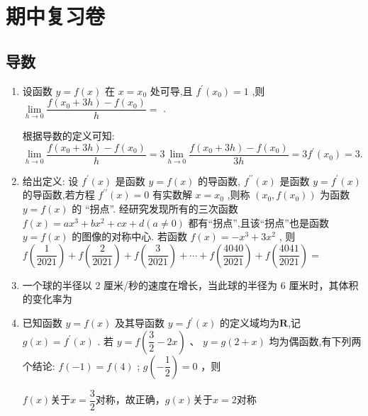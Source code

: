 \section*{期中复习卷}
\subsection*{导数}
\begin{enumerate}
    \item 设函数 $y = f\left( x\right)$ 在 $x = {x}_{0}$ 处可导,且 ${f}^{\prime }\left( {x}_{0}\right)  = 1$ ,则 $\mathop{\lim }\limits_{{h \rightarrow  0}}\dfrac{f\left( {{x}_{0} + {3h}}\right)  - f\left( {x}_{0}\right) }{h} =$ .
    \begin{jieda}
        根据导数的定义可知: $\mathop{\lim }\limits_{{h \rightarrow  0}}\dfrac{f\left( {{x}_{0} + {3h}}\right)  - f\left( {x}_{0}\right) }{h} = 3\mathop{\lim }\limits_{{h \rightarrow  0}}\dfrac{f\left( {{x}_{0} + {3h}}\right)  - f\left( {x}_{0}\right) }{3h} = 3{f}^{\prime }\left( {x}_{0}\right)  = 3$.
    \end{jieda}
    
    \item 给出定义: 设 ${f}^{\prime }\left( x\right)$ 是函数 $y = f\left( x\right)$ 的导函数, ${f}^{\prime \prime }\left( x\right)$ 是函数 $y = {f}^{\prime }\left( x\right)$ 的导函数,若方程 ${f}^{\prime \prime }\left( x\right)  = 0$ 有实数解 $x = {x}_{0}$ ,则称 $\left( {{x}_{0},f\left( {x}_{0}\right) }\right)$ 为函数 $y = f\left( x\right)$ 的 “拐点”. 经研究发现所有的三次函数 $f\left( x\right)  = a{x}^{3} + b{x}^{2} + {cx} + d\left( {a \neq  0}\right)$ 都有“拐点”,且该“拐点”也是函数 $y = f\left( x\right)$ 的图像的对称中心. 若函数 $f\left( x\right)  =  - {x}^{3} + 3{x}^{2}$ , 则 $f\left( \dfrac{1}{2021}\right)  + f\left( \dfrac{2}{2021}\right)  + f\left( \dfrac{3}{2021}\right)  + \cdots  + f\left( \dfrac{4040}{2021}\right)  + f\left( \dfrac{4041}{2021}\right)  =$
    
    \item 一个球的半径以 2 厘米/秒的速度在增长，当此球的半径为 6 厘米时，其体积的变化率为
    
    \item 已知函数 $y = f\left( x\right)$ 及其导函数 $y = {f}^{\prime }\left( x\right)$ 的定义域均为$\mathbf{R}$,记 $g\left( x\right)  = {f}^{\prime }\left( x\right)$ . 若 $y = f\left( {\dfrac{3}{2} - {2x}}\right) \text{ 、 }y = g\left( {2 + x}\right)$ 均为偶函数,有下列两个结论:    $f\left( {-1}\right)  = f\left( 4\right)$ ;    $g\left( {-\dfrac{1}{2}}\right)  = 0$ ，则
    \begin{jieda}
        $f(x)$关于$x = \dfrac{3}{2}$对称，故正确，$g(x)$关于$x = 2$对称


\end{jieda}
\end{enumerate}
